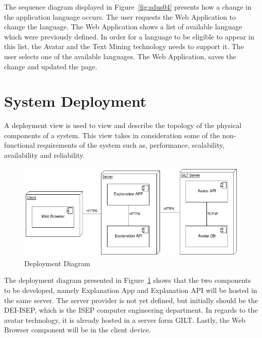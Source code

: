 The sequence diagram displayed in Figure~\ref{fig:sdus04} presents how a change in the application language occurs.
The user requests the Web Application to change the language.
The Web Application shows a list of available language which were previously defined.
In order for a language to be eligible to appear in this list, the Avatar and the Text Mining technology needs to support it.
The user selects one of the available languages.
The Web Application, saves the change and updated the page.

\section{System Deployment}

A deployment view is used to view and describe the topology of the physical components of a system.
This view takes in consideration some of the non-functional requirements of the system such as, performance, scalability, availability and reliability.

\begin{figure}[H]
\centering
\includegraphics[width=\textwidth,keepaspectratio]{ch4/assets/deployment_diagram.png}
\caption[Deployment Diagram]{Deployment Diagram}
\label{fig:deploy}
\end{figure}

The deployment diagram presented in Figure~\ref{fig:deploy} shows that the two components to be developed, namely Explanation App and Explanation API will be hosted in the same server.
The server provider is not yet defined, but initially should be the DEI-ISEP, which is the ISEP computer engineering department.
In regards to the avatar technology, it is already hosted in a server form GILT.
Lastly, the Web Browser component will be in the client device.
